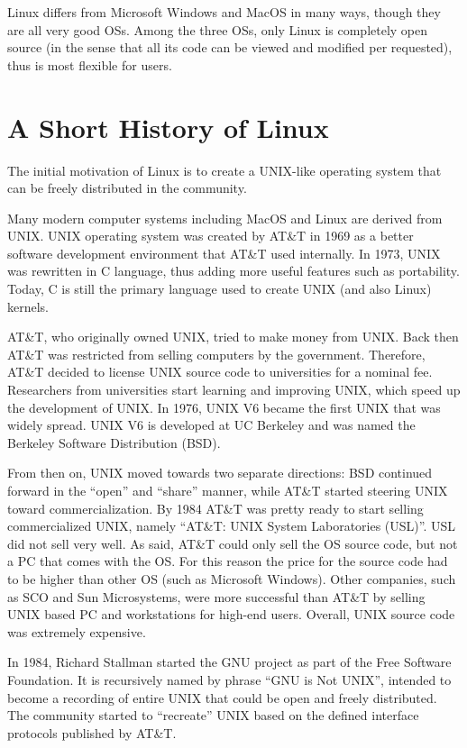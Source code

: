 Linux differs from Microsoft Windows and MacOS in many ways, though they are all very good OSs. Among the three OSs, only Linux is completely open source (in the sense that all its code can be viewed and modified per requested), thus is most flexible for users.

\section{A Short History of Linux}

The initial motivation of Linux is to create a UNIX-like operating system that can be freely distributed in the community.

Many modern computer systems including MacOS and Linux are derived from UNIX. UNIX operating system was created by AT\&T in 1969 as a better software development environment that AT\&T used internally. In 1973, UNIX was rewritten in C language, thus adding more useful features such as portability. Today, C is still the primary language used to create UNIX (and also Linux) kernels.

AT\&T, who originally owned UNIX, tried to make money from UNIX. Back then AT\&T was restricted from selling computers by the government. Therefore, AT\&T decided to license UNIX source code to universities for a nominal fee. Researchers from universities start learning and improving UNIX, which speed up the development of UNIX. In 1976, UNIX V6 became the first UNIX that was widely spread. UNIX V6 is developed at UC Berkeley and was named the Berkeley Software Distribution (BSD).

From then on, UNIX moved towards two separate directions: BSD continued forward in the ``open'' and ``share'' manner, while AT\&T started steering UNIX toward commercialization. By 1984 AT\&T was pretty ready to start selling commercialized UNIX, namely ``AT\&T: UNIX System Laboratories (USL)''. USL did not sell very well. As said, AT\&T could only sell the OS source code, but not a PC that comes with the OS. For this reason the price for the source code had to be higher than other OS (such as Microsoft Windows). Other companies, such as SCO and Sun Microsystems, were more successful than AT\&T by selling UNIX based PC and workstations for high-end users. Overall, UNIX source code was extremely expensive.

In 1984, Richard Stallman started the GNU project as part of the Free Software Foundation. It is recursively named by phrase ``GNU is Not UNIX'', intended to become a recording of entire UNIX that could be open and freely distributed. The community started to ``recreate'' UNIX based on the defined interface protocols published by AT\&T.

